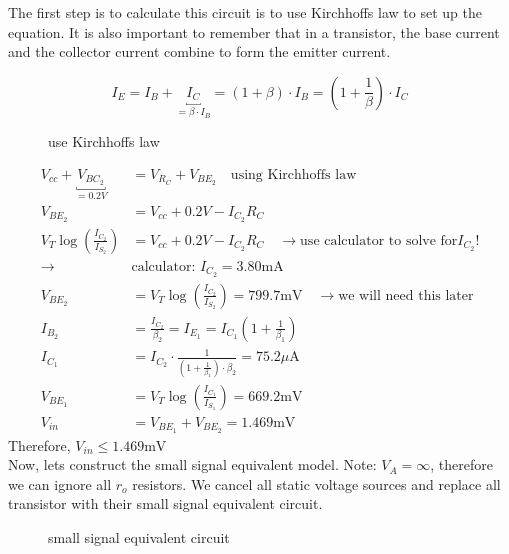 \documentclass[11ypt]{extarticle}
\begin{document}
The first step is to calculate this circuit is to use Kirchhoffs law to set up the equation.
It is also important to remember that in a transistor, the base current and the collector current combine to form the emitter current.

\begin{equation}
I_E = I_B + \underbracket{I_C}_{= \beta \cdot I_B} = (1 + \beta) \cdot I_B = \left(1 + \frac{1}{\beta} \right) \cdot I_C 
\end{equation}

\begin{figure}[H]{} 
    \centering
    
    \caption{use Kirchhoffs law}
\end{figure}

\begin{equation}
\begin{aligned}
V_{cc} + \underbracket{V_{BC_2}}_{= 0.2 V} &= V_{R_C} + V_{BE_2} \quad \text{using Kirchhoffs law}
\\
V_{BE_2} &= V_{cc} + 0.2V - I_{C_2}R_C \quad
\\
V_T \log \left( \frac{I_{C_2}}{I_{S_2}} \right) &= V_{cc} + 0.2V - I_{C_2}R_C \quad \to \text{use calculator to solve for} I_{C_2} \text{!}
\\
\to & \text{calculator: } I_{C_2} = 3.80 \text{mA}
\\
V_{BE_2} &= V_T \log \left( \frac{I_{C_2}}{I_{S_2}} \right) = 799.7 \text{mV} \quad \to \text{we will need this later}
\\
I_{B_2} &= \frac{I_{C_2}}{\beta_2} = I_{E_1} = I_{C_1} \left(1 + \frac{1}{\beta_1} \right)
\\
I_{C_1} &= I_{C_2} \cdot \frac{1}{\left(1 + \frac{1}{\beta_1} \right) \cdot \beta_2} = 75.2 \mu \text{A}
\\
V_{BE_1} &= V_T \log \left( \frac{I_{C_1}}{I_{S_1}} \right) = 669.2 \text{mV}
\\
V_{in} &= V_{BE_1} + V_{BE_2} = 1.469 \text{mV}
\end{aligned}
\end{equation}
Therefore, $V_{in} \leq  1.469 \text{mV}$
\\
Now, lets construct the small signal equivalent model.
Note: $V_A = \infty$, therefore we can ignore all $r_o$ resistors. We cancel all static voltage sources and replace all transistor with their small signal equivalent circuit.

\begin{figure}[H]{} 
    \centering
    
    \caption{small signal equivalent circuit}
\end{figure}
\end{document}
